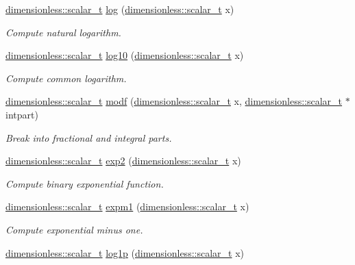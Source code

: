 \begin{DoxyCompactItemize}
\hyperlink{classunits_1_1unit__t}{dimensionless\+::scalar\+\_\+t} \hyperlink{group___unit_math_gaa5546fee0dc5605e81f9043ca9c6824e}{log} (\hyperlink{classunits_1_1unit__t}{dimensionless\+::scalar\+\_\+t} x)
\begin{DoxyCompactList}\small\item\em Compute natural logarithm. \end{DoxyCompactList}\item 
\hyperlink{classunits_1_1unit__t}{dimensionless\+::scalar\+\_\+t} \hyperlink{group___unit_math_ga45faebb72bfc8a22e2ff5539dbb70655}{log10} (\hyperlink{classunits_1_1unit__t}{dimensionless\+::scalar\+\_\+t} x)
\begin{DoxyCompactList}\small\item\em Compute common logarithm. \end{DoxyCompactList}\item 
\hyperlink{classunits_1_1unit__t}{dimensionless\+::scalar\+\_\+t} \hyperlink{group___unit_math_ga86079fd9cf2ca37075ae5628a812f6c8}{modf} (\hyperlink{classunits_1_1unit__t}{dimensionless\+::scalar\+\_\+t} x, \hyperlink{classunits_1_1unit__t}{dimensionless\+::scalar\+\_\+t} $\ast$intpart)
\begin{DoxyCompactList}\small\item\em Break into fractional and integral parts. \end{DoxyCompactList}\item 
\hyperlink{classunits_1_1unit__t}{dimensionless\+::scalar\+\_\+t} \hyperlink{group___unit_math_ga2567044806581efac6543d0f0eadfd6f}{exp2} (\hyperlink{classunits_1_1unit__t}{dimensionless\+::scalar\+\_\+t} x)
\begin{DoxyCompactList}\small\item\em Compute binary exponential function. \end{DoxyCompactList}\item 
\hyperlink{classunits_1_1unit__t}{dimensionless\+::scalar\+\_\+t} \hyperlink{group___unit_math_ga902e7c7a2b43eb88b3695e458fd5be7f}{expm1} (\hyperlink{classunits_1_1unit__t}{dimensionless\+::scalar\+\_\+t} x)
\begin{DoxyCompactList}\small\item\em Compute exponential minus one. \end{DoxyCompactList}\item 
\hyperlink{classunits_1_1unit__t}{dimensionless\+::scalar\+\_\+t} \hyperlink{group___unit_math_ga8efe4c7b9d7f4377aa25d2d4aac13cec}{log1p} (\hyperlink{classunits_1_1unit__t}{dimensionless\+::scalar\+\_\+t} x)

\end{DoxyCompactItemize}
